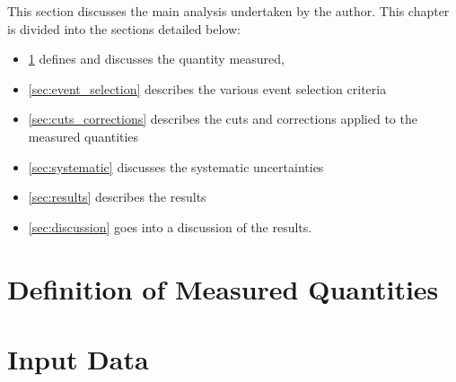 





This section discusses the main analysis undertaken by the author.
This chapter is divided into the sections detailed below:

\begin{itemize}
\item \ref{sec:trkjet_corr_measurement} defines and discusses the quantity measured,
\item \ref{sec:event_selection} describes the various event selection criteria
\item \ref{sec:cuts_corrections} describes the cuts and corrections applied to the measured quantities
\item \ref{sec:systematic} discusses the systematic uncertainties
\item \ref{sec:results} describes the results
\item \ref{sec:discussion} goes into a discussion of the results.

\end{itemize}

\section{Definition of Measured Quantities}
\label{sec:trkjet_corr_measurement}


\section{Input Data}
\label{sec:used_data}


